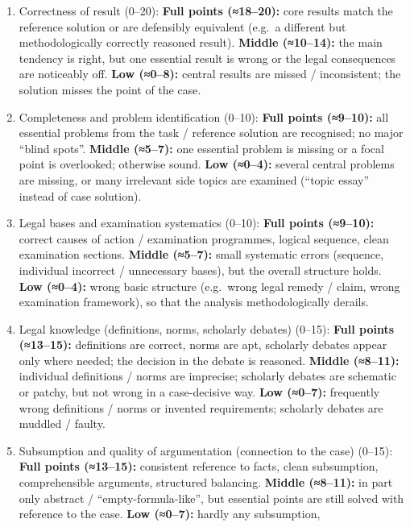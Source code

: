 \documentclass[11pt]{article}
\providecommand{\tightlist}{%
  \setlength{\itemsep}{0pt}\setlength{\parskip}{0pt}}
\begin{document}
\begin{enumerate}
\def\labelenumi{\arabic{enumi}.}
\tightlist
\item
  Correctness of result (0--20): \textbf{Full points (≈18--20):} core
  results match the reference solution or are defensibly equivalent
  (e.g.~a different but methodologically correctly reasoned result).
  \textbf{Middle (≈10--14):} the main tendency is right, but one
  essential result is wrong or the legal consequences are noticeably
  off. \textbf{Low (≈0--8):} central results are missed / inconsistent;
  the solution misses the point of the case.
\item
  Completeness and problem identification (0--10): \textbf{Full points
  (≈9--10):} all essential problems from the task / reference solution
  are recognised; no major ``blind spots''. \textbf{Middle (≈5--7):} one
  essential problem is missing or a focal point is overlooked; otherwise
  sound. \textbf{Low (≈0--4):} several central problems are missing, or
  many irrelevant side topics are examined (``topic essay'' instead of
  case solution).
\item
  Legal bases and examination systematics (0--10): \textbf{Full points
  (≈9--10):} correct causes of action / examination programmes, logical
  sequence, clean examination sections. \textbf{Middle (≈5--7):} small
  systematic errors (sequence, individual incorrect / unnecessary
  bases), but the overall structure holds. \textbf{Low (≈0--4):} wrong
  basic structure (e.g.~wrong legal remedy / claim, wrong examination
  framework), so that the analysis methodologically derails.
\item
  Legal knowledge (definitions, norms, scholarly debates) (0--15):
  \textbf{Full points (≈13--15):} definitions are correct, norms are
  apt, scholarly debates appear only where needed; the decision in the
  debate is reasoned. \textbf{Middle (≈8--11):} individual definitions /
  norms are imprecise; scholarly debates are schematic or patchy, but
  not wrong in a case-decisive way. \textbf{Low (≈0--7):} frequently
  wrong definitions / norms or invented requirements; scholarly debates
  are muddled / faulty.
\item
  Subsumption and quality of argumentation (connection to the case)
  (0--15): \textbf{Full points (≈13--15):} consistent reference to
  facts, clean subsumption, comprehensible arguments, structured
  balancing. \textbf{Middle (≈8--11):} in part only abstract /
  ``empty-formula-like'', but essential points are still solved with
  reference to the case. \textbf{Low (≈0--7):} hardly any subsumption,

\end{enumerate}
\end{document}
